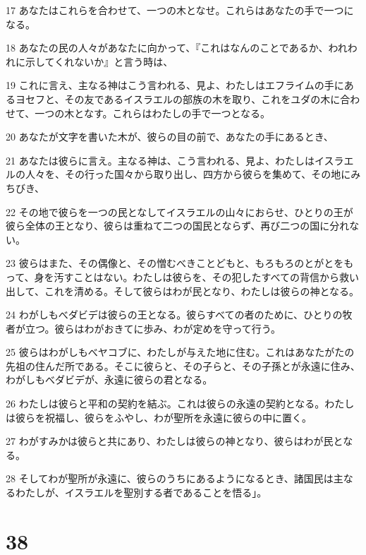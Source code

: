 \par 17 あなたはこれらを合わせて、一つの木となせ。これらはあなたの手で一つになる。
\par 18 あなたの民の人々があなたに向かって、『これはなんのことであるか、われわれに示してくれないか』と言う時は、
\par 19 これに言え、主なる神はこう言われる、見よ、わたしはエフライムの手にあるヨセフと、その友であるイスラエルの部族の木を取り、これをユダの木に合わせて、一つの木となす。これらはわたしの手で一つとなる。
\par 20 あなたが文字を書いた木が、彼らの目の前で、あなたの手にあるとき、
\par 21 あなたは彼らに言え。主なる神は、こう言われる、見よ、わたしはイスラエルの人々を、その行った国々から取り出し、四方から彼らを集めて、その地にみちびき、
\par 22 その地で彼らを一つの民となしてイスラエルの山々におらせ、ひとりの王が彼ら全体の王となり、彼らは重ねて二つの国民とならず、再び二つの国に分れない。
\par 23 彼らはまた、その偶像と、その憎むべきことどもと、もろもろのとがとをもって、身を汚すことはない。わたしは彼らを、その犯したすべての背信から救い出して、これを清める。そして彼らはわが民となり、わたしは彼らの神となる。
\par 24 わがしもべダビデは彼らの王となる。彼らすべての者のために、ひとりの牧者が立つ。彼らはわがおきてに歩み、わが定めを守って行う。
\par 25 彼らはわがしもべヤコブに、わたしが与えた地に住む。これはあなたがたの先祖の住んだ所である。そこに彼らと、その子らと、その子孫とが永遠に住み、わがしもべダビデが、永遠に彼らの君となる。
\par 26 わたしは彼らと平和の契約を結ぶ。これは彼らの永遠の契約となる。わたしは彼らを祝福し、彼らをふやし、わが聖所を永遠に彼らの中に置く。
\par 27 わがすみかは彼らと共にあり、わたしは彼らの神となり、彼らはわが民となる。
\par 28 そしてわが聖所が永遠に、彼らのうちにあるようになるとき、諸国民は主なるわたしが、イスラエルを聖別する者であることを悟る」。

\chapter{38}

